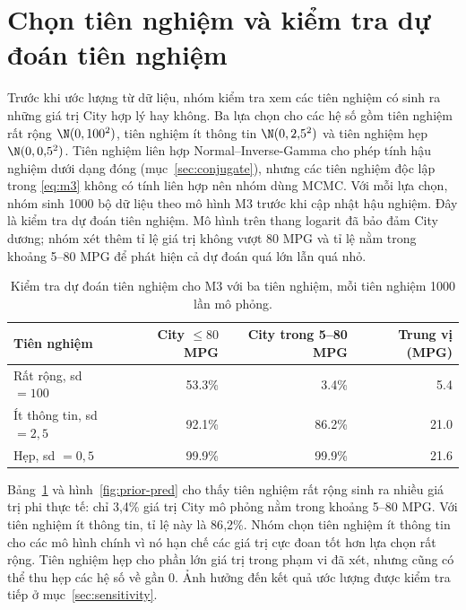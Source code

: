 \documentclass[12pt,a4paper]{report}
\begin{document}
\section{Chọn tiên nghiệm và kiểm tra dự đoán tiên nghiệm}
\label{sec:priors}

Trước khi ước lượng từ dữ liệu, nhóm kiểm tra xem các tiên nghiệm có sinh ra
những giá trị City hợp lý hay không. Ba lựa chọn cho các hệ số gồm tiên nghiệm rất rộng
$\N(0, 100^2)$, tiên nghiệm ít thông tin $\N(0, 2{,}5^2)$ và tiên nghiệm hẹp
$\N(0, 0{,}5^2)$. Tiên nghiệm liên hợp Normal--Inverse-Gamma cho phép tính hậu
nghiệm dưới dạng đóng (mục~\ref{sec:conjugate}), nhưng các tiên nghiệm độc lập
trong \eqref{eq:m3} không có tính liên hợp nên nhóm dùng MCMC. Với mỗi lựa chọn,
nhóm sinh \num{1000} bộ dữ liệu theo mô hình M3 trước khi cập nhật hậu nghiệm.
Đây là kiểm tra dự đoán tiên nghiệm. Mô hình trên thang logarit đã bảo đảm City
dương; nhóm xét thêm tỉ lệ giá trị không vượt 80 MPG và tỉ lệ nằm trong khoảng
5--80 MPG để phát hiện cả dự đoán quá lớn lẫn quá nhỏ.

\begin{table}[tp]
  \centering
  \caption{Kiểm tra dự đoán tiên nghiệm cho M3 với ba tiên nghiệm, mỗi tiên
    nghiệm \num{1000} lần mô phỏng.}
  \label{tab:prior-pred}
  \begin{tabular}{lrrr}
    \toprule
    Tiên nghiệm & City $\le 80$ MPG & City trong 5--80 MPG & Trung vị (MPG) \\
    \midrule
    Rất rộng, sd $= 100$     & \num{53.3}\% & \num{3.4}\%  & \num{5.4} \\
    Ít thông tin, sd $= 2{,}5$ & \num{92.1}\% & \num{86.2}\% & \num{21.0} \\
    Hẹp, sd $= 0{,}5$       & \num{99.9}\% & \num{99.9}\% & \num{21.6} \\
    \bottomrule
  \end{tabular}
\end{table}

Bảng~\ref{tab:prior-pred} và hình~\ref{fig:prior-pred} cho thấy tiên nghiệm
rất rộng sinh ra nhiều giá trị phi thực tế: chỉ 3{,}4\% giá trị City mô phỏng
nằm trong khoảng 5--80 MPG. Với tiên nghiệm ít thông tin, tỉ lệ này là 86{,}2\%.
Nhóm chọn tiên nghiệm ít thông tin cho các mô hình chính vì nó hạn chế các giá
trị cực đoan tốt hơn lựa chọn rất rộng. Tiên nghiệm hẹp cho phần lớn giá trị
trong phạm vi đã xét, nhưng cũng có thể thu hẹp các hệ số về gần 0. Ảnh hưởng
đến kết quả ước lượng được kiểm tra tiếp ở mục~\ref{sec:sensitivity}.
\end{document}
